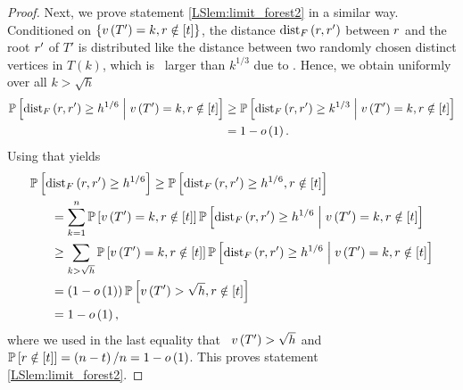 \begin{proof}
Next, we prove statement \ref{LSlem:limit_forest2} in a similar way. Conditioned on $\left\{v\left({T'}\right)=k, r\notin [t]\right\}$, the distance $\operatorname{dist}_{F}\left(r, r'\right)$ between $r$ and the root $r'$ of $T'$ is distributed like the distance between two randomly chosen distinct vertices in $T(k)$, which is \whp\ larger than $k^{1/3}$ due to . Hence, we obtain uniformly over all $k>\sqrt{h}$
\begin{align*}
\mathbb{P}\left[\operatorname{dist}_{F}\left(r, r'\right)\geq h^{1/6} \;\middle|\; v\left({T'}\right)=k, r\notin [t]\right]&
\geq \mathbb{P}\left[\operatorname{dist}_{F}\left(r, r'\right)\geq k^{1/3} \;\middle|\; v\left({T'}\right)=k, r\notin [t]\right]
\\
&=1-o\left(1\right).
\end{align*}
Using that yields
\begin{align*}
&\mathbb{P}\left[\operatorname{dist}_{F}\left(r, r'\right)\geq h^{1/6}\right]
\geq \mathbb{P}\left[\operatorname{dist}_{F}\left(r, r'\right)\geq h^{1/6}, r\notin [t]\right]
\\
&~~~~~=\sum_{k=1}^{n}\mathbb{P}\left[v\left({T'}\right)=k, r\notin [t]\right]\mathbb{P}\left[\operatorname{dist}_{F}\left(r, r'\right)\geq h^{1/6} \;\middle|\; v\left({T'}\right)=k, r\notin [t]\right]
\\
&~~~~~\geq
\sum_{k>\sqrt{h}}\mathbb{P}\left[v\left({T'}\right)=k, r\notin [t]\right]\mathbb{P}\left[\operatorname{dist}_{F}\left(r, r'\right)\geq h^{1/6} \;\middle|\; v\left({T'}\right)=k, r\notin [t]\right]
\\
&~~~~~=
\left(1-o\left(1\right)\right)\mathbb{P}\left[v\left({T'}\right)>\sqrt{h}, r\notin [t]\right]
\\
&~~~~~=1-o\left(1\right),
\end{align*}
where we used in the last equality that \whp\ $v\left({T'}\right)>\sqrt{h}$ and $\mathbb{P}\left[r\notin [t]\right]=\left(n-t\right)/n=1-o\left(1\right)$.
This proves statement \ref{LSlem:limit_forest2}.
\end{proof}


